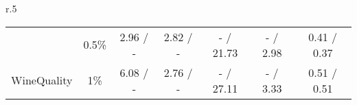 \begin{wraptable}[23]{r}{.5\textwidth}
{\begin{tabular}{ccccccc}
{}                              & {0.5\%}    & {2.96 / -}                                     & {2.82 / -}                                  & {- / 21.73}                                      & {- / 2.98}                                       & {0.41 / 0.37} \\
\multirow{-5}{*}{{WineQuality}} & {1\%}      & {6.08 / -}                                     & {2.76 / -}                                  & {- / 27.11}                                      & {- / 3.33}                                       & {0.51 / 0.51}\\
\midrule
\bottomrule
\end{tabular}%
}
\end{wraptable}
